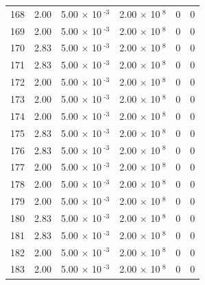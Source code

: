 \documentclass[a4paper,11pt]{article}
\begin{document}
\begin{center}
\begin{longtable}{|R{1.5cm}|R{2.4cm}|R{2.4cm}|R{2.4cm}|R{2.4cm}|R{2.4cm}|}
  168 &   2.00  &         5.00 $\times$ 10$^{\text{          -3}}$  &         2.00 $\times$ 10$^{\text{           8}}$  & 0  & 0 \\
  169 &   2.00  &         5.00 $\times$ 10$^{\text{          -3}}$  &         2.00 $\times$ 10$^{\text{           8}}$  & 0  & 0 \\
  170 &   2.83  &         5.00 $\times$ 10$^{\text{          -3}}$  &         2.00 $\times$ 10$^{\text{           8}}$  & 0  & 0 \\
  171 &   2.83  &         5.00 $\times$ 10$^{\text{          -3}}$  &         2.00 $\times$ 10$^{\text{           8}}$  & 0  & 0 \\
  172 &   2.00  &         5.00 $\times$ 10$^{\text{          -3}}$  &         2.00 $\times$ 10$^{\text{           8}}$  & 0  & 0 \\
  173 &   2.00  &         5.00 $\times$ 10$^{\text{          -3}}$  &         2.00 $\times$ 10$^{\text{           8}}$  & 0  & 0 \\
  174 &   2.00  &         5.00 $\times$ 10$^{\text{          -3}}$  &         2.00 $\times$ 10$^{\text{           8}}$  & 0  & 0 \\
  175 &   2.83  &         5.00 $\times$ 10$^{\text{          -3}}$  &         2.00 $\times$ 10$^{\text{           8}}$  & 0  & 0 \\
  176 &   2.83  &         5.00 $\times$ 10$^{\text{          -3}}$  &         2.00 $\times$ 10$^{\text{           8}}$  & 0  & 0 \\
  177 &   2.00  &         5.00 $\times$ 10$^{\text{          -3}}$  &         2.00 $\times$ 10$^{\text{           8}}$  & 0  & 0 \\
  178 &   2.00  &         5.00 $\times$ 10$^{\text{          -3}}$  &         2.00 $\times$ 10$^{\text{           8}}$  & 0  & 0 \\
  179 &   2.00  &         5.00 $\times$ 10$^{\text{          -3}}$  &         2.00 $\times$ 10$^{\text{           8}}$  & 0  & 0 \\
  180 &   2.83  &         5.00 $\times$ 10$^{\text{          -3}}$  &         2.00 $\times$ 10$^{\text{           8}}$  & 0  & 0 \\
  181 &   2.83  &         5.00 $\times$ 10$^{\text{          -3}}$  &         2.00 $\times$ 10$^{\text{           8}}$  & 0  & 0 \\
  182 &   2.00  &         5.00 $\times$ 10$^{\text{          -3}}$  &         2.00 $\times$ 10$^{\text{           8}}$  & 0  & 0 \\
  183 &   2.00  &         5.00 $\times$ 10$^{\text{          -3}}$  &         2.00 $\times$ 10$^{\text{           8}}$  & 0  & 0 \\

\end{longtable}
\end{center}
\end{document}
